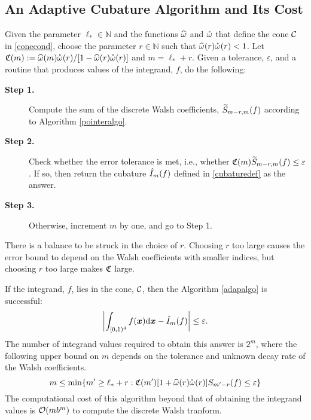 \documentclass[graybox,footinfo]{svmult}
\newcommand{\N}{\mathbb{N}} %
\newcommand{\bsx}{\boldsymbol{x}}    %
\begin{document}
\subsection{An Adaptive Cubature Algorithm and Its Cost}

\begin{algo} \label{adapalgo} Given the parameter $\ell_* \in \N$ and the functions $\widehat{\omega}$ and  $\mathring{\omega}$ that define the cone $\mathcal{C}$ in \eqref{conecond}, choose the parameter $r \in \N$ such that $\widehat{\omega}(r)\mathring{\omega}(r)<1$.  Let $\mathfrak{C}(m): = \widehat{\omega}(m)\mathring{\omega}(r)/[1 - \widehat{\omega}(r)\mathring{\omega}(r)]$ and $m=\ell_*+r$.
Given a tolerance, $\varepsilon$, and a routine that produces values of the integrand, $f$, do the following:

\begin{description}
\item[\textbf{Step 1.}] Compute the sum of the discrete Walsh coefficients, $\widetilde{S}_{m-r,m}(f)$ according to Algorithm \ref{pointeralgo}.  

\item[\textbf{Step 2.}] Check whether the error tolerance is met, i.e., whether $\mathfrak{C}(m)  \widetilde{S}_{m-r,m}(f) \le \varepsilon$. If so, then return the cubature $\hat{I}_m(f)$ defined in \eqref{cubaturedef} as the answer.

\item[\textbf{Step 3.}] Otherwise, increment $m$ by one, and go to Step 1.
\end{description}

\end{algo}

There is a balance to be struck in the choice of $r$.  Choosing $r$ too large causes the error bound to depend on the Walsh coefficients with smaller indices, but choosing $r$ too large makes $\mathfrak{C}$ large.

\begin{theorem} \label{adapalgothm} If the integrand, $f$, lies in the cone, $\mathcal{C}$, then the Algorithm \ref{adapalgo} is successful: 
\[
\biggabs{\int_{\cube} f(\bsx) \D \bsx - \hI_m(f)} \le \varepsilon.
\]
The number of integrand values required to obtain this answer is $2^m$, where the following upper bound on $m$ depends on the tolerance and unknown decay rate of the Walsh coefficients.
\[
m \le \min \{m' \ge \ell_*+r : \mathfrak{C}(m') [1+ \widehat{\omega}(r) \mathring{\omega}(r)] S_{m'-r}(f) \le \varepsilon \}
\]
The computational cost of this algorithm beyond that of obtaining the integrand values is $\mathcal{O}(m b^m )$ to compute the discrete Walsh tranform.
\end{theorem}
\end{document}
